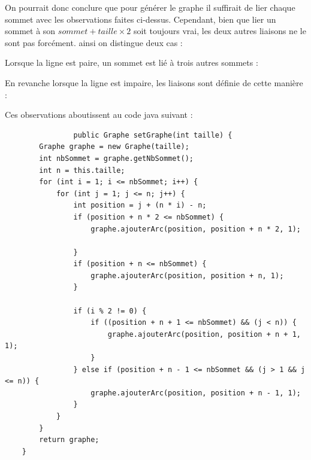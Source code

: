 \documentclass{report}
\begin{document}
			On pourrait donc conclure que pour générer le graphe il suffirait de lier chaque sommet avec les observations faites ci-dessus. Cependant, bien que lier un sommet à son $sommet+taille\times2$ soit toujours vrai, les deux autres liaisons ne le sont pas forcément. ainsi on distingue deux cas :
			
			
				
			Lorsque la ligne est paire, un sommet est lié à trois autres sommets :
				
				
			En revanche lorsque la ligne est impaire, les liaisons sont définie de cette manière : 
				
					
			Ces observations aboutissent au code java suivant : 
			\\
			\begin{verbatim}
				public Graphe setGraphe(int taille) {
        Graphe graphe = new Graphe(taille);
        int nbSommet = graphe.getNbSommet();
        int n = this.taille;
        for (int i = 1; i <= nbSommet; i++) { 
            for (int j = 1; j <= n; j++) { 
                int position = j + (n * i) - n;
                if (position + n * 2 <= nbSommet) { 
                    graphe.ajouterArc(position, position + n * 2, 1);

                }
                if (position + n <= nbSommet) {
                    graphe.ajouterArc(position, position + n, 1);
                }

                if (i % 2 != 0) {    
                    if ((position + n + 1 <= nbSommet) && (j < n)) { 
                        graphe.ajouterArc(position, position + n + 1, 1);
                    }
                } else if (position + n - 1 <= nbSommet && (j > 1 && j <= n)) {
                    graphe.ajouterArc(position, position + n - 1, 1);
                }
            }
        }
        return graphe;
    }
			\end{verbatim}
								
\end{document}
